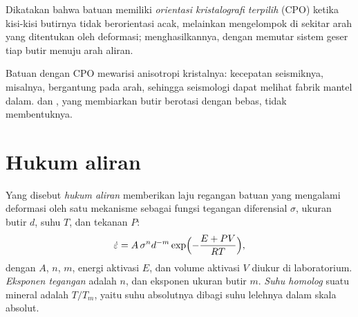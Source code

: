\begin{definition}\label{def:b3:deformation-mechanisms:cpo}
Dikatakan bahwa batuan memiliki \emph{orientasi kristalografi terpilih}
(CPO) ketika kisi-kisi butirnya tidak berorientasi
acak, melainkan mengelompok di sekitar arah yang ditentukan oleh deformasi; 
menghasilkannya, dengan memutar sistem geser tiap butir menuju arah aliran.
\end{definition}

Batuan dengan CPO mewarisi anisotropi kristalnya: kecepatan seismiknya,
misalnya, bergantung pada arah, sehingga seismologi dapat melihat fabrik
mantel dalam.  dan , yang membiarkan butir
berotasi dengan bebas, tidak membentuknya.

\section{Hukum aliran}

\begin{definition}\label{def:b3:deformation-mechanisms:flow-law}
Yang disebut \emph{hukum aliran} memberikan laju regangan batuan yang mengalami deformasi oleh
satu mekanisme sebagai fungsi tegangan diferensial $\sigma$, ukuran butir
$d$, suhu $T$, dan tekanan $P$:
\[
  \dot\varepsilon = A\,\sigma^nd^{-m}\exp\Bigl(-\frac{E + PV}{RT}\Bigr),
\]
dengan $A$, $n$, $m$, energi aktivasi $E$, dan volume aktivasi $V$
diukur di laboratorium. \emph{Eksponen tegangan}
adalah $n$, dan eksponen ukuran butir $m$. \emph{Suhu
homolog} suatu mineral adalah $T/T_m$, yaitu
suhu absolutnya dibagi suhu lelehnya dalam skala absolut.
\end{definition}

